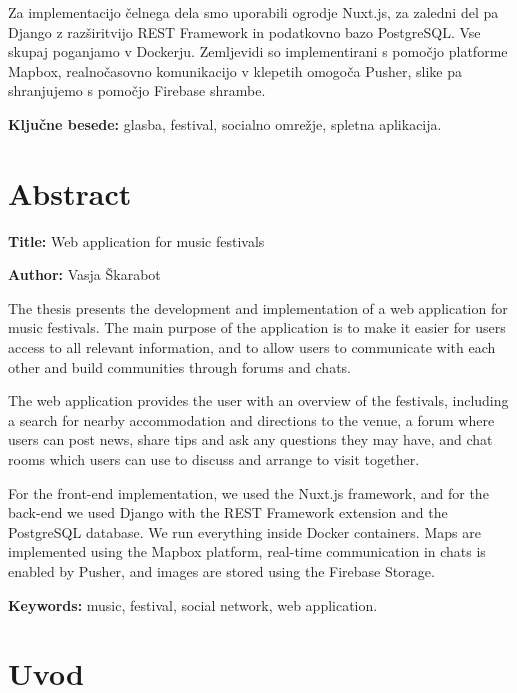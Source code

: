 \documentclass[a4paper,12pt,openright]{book}
\newcommand{\ttitleEn}{Web application for music festivals}
\newcommand{\tauthor}{Vasja Škarabot}
\newcommand{\tkeywords}{glasba, festival, socialno omrežje, spletna aplikacija}
\newcommand{\tkeywordsEn}{music, festival, social network, web application}
\newcommand{\clearemptydoublepage}{\newpage{\pagestyle{empty}\cleardoublepage}}
\begin{document}
Za implementacijo čelnega dela smo uporabili ogrodje Nuxt.js, za zaledni del pa Django z razširitvijo REST Framework in podatkovno bazo PostgreSQL. Vse skupaj poganjamo v Dockerju.
Zemljevidi so implementirani s pomočjo platforme Mapbox, realnočasovno komunikacijo v klepetih omogoča Pusher, slike pa shranjujemo s pomočjo Firebase shrambe.

\bigskip

\noindent\textbf{Ključne besede:} \tkeywords.
\clearemptydoublepage

{}
\chapter*{Abstract}

\noindent\textbf{Title:} \ttitleEn
\bigskip

\noindent\textbf{Author:} \tauthor
\bigskip

\noindent 
The thesis presents the development and implementation of a web application for music festivals. The main purpose of the application is to make it easier for users
access to all relevant information, and to allow users to communicate with each other and build communities through forums and chats. 

The web application provides the user with an overview of the festivals, including a search for nearby accommodation and directions to the venue, a forum where users can
post news, share tips and ask any questions they may have, and chat rooms which users can use to discuss and arrange to visit together. 

For the front-end implementation, we used the Nuxt.js framework, and for the back-end we used Django with the REST Framework extension and the PostgreSQL database. 
We run everything inside Docker containers. Maps are implemented using the Mapbox platform, real-time communication in chats is enabled by Pusher, and images are stored using the Firebase Storage.

\bigskip

\noindent\textbf{Keywords:} \tkeywordsEn.
\clearemptydoublepage

\mainmatter
\setcounter{page}{1}
\pagestyle{fancy}

\chapter{Uvod}
\end{document}
